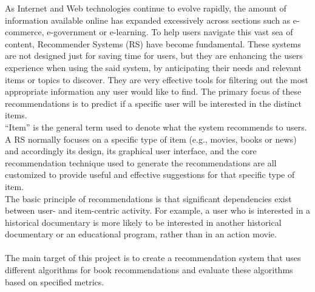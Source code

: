 \documentclass[\myFontSize,oneside,english,hidelinks,a4paper]{article}
\begin{document}
As Internet and Web technologies continue to evolve rapidly, the amount of information available online has expanded excessively across sections such as e-commerce, e-government or e-learning. To help users navigate this vast sea of content, Recommender Systems (RS) have become fundamental. These systems are not designed just for saving time for users, but they are enhancing the users experience when using the said system, by anticipating their needs and relevant items or topics to discover. They are very effective tools for filtering out the most appropriate information any user would like to find. The primary focus of these recommendations is to predict if a specific user will be interested in the distinct items.\\
%
“Item” is the general term used to denote what the system recommends to users. A RS normally focuses on a specific type of item (e.g., movies, books or news) and accordingly its design, its graphical user interface, and the core recommendation technique used to generate the recommendations are all customized to provide useful and effective suggestions for that specific type of item. \cite{pub.1036183961}\\
%
The basic principle of recommendations is that significant dependencies exist between user- and item-centric activity. 
For example, a user who is interested in a historical documentary is more likely to be interested in another historical documentary or an educational program, rather than in an action movie. \cite{pub.1022525812}\\\\
%
The main target of this project is to create a recommendation system that uses different algorithms for book recommendations and evaluate these algorithms based on specified metrics.\\





\clearpage{}
\end{document}

